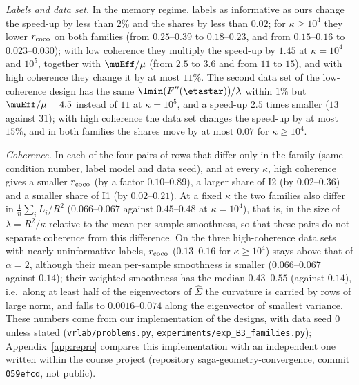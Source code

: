 \emph{Labels and data set.} In the memory regime, labels as informative as ours change the speed-up by less than $2\%$ and
the shares by less than $0.02$; for $\kappa\ge10^4$ they lower $r_{\rm coco}$ on both families (from $0.25$--$0.39$ to $0.18$--$0.23$,
and from $0.15$--$0.16$ to $0.023$--$0.030$); with low coherence they multiply the speed-up by $1.45$ at $\kappa=10^4$ and
$10^5$, together with $\muEff/\mu$ (from $2.5$ to $3.6$ and from $11$ to $15$), and with high coherence they change it by
at most $11\%$. The second data set of the low-coherence design has the same $\lmin(F''(\etastar))/\lambda$ within $1\%$
but $\muEff/\mu=4.5$ instead of $11$ at $\kappa=10^5$, and a speed-up $2.5$ times smaller ($13$ against $31$); with high
coherence the data set changes the speed-up by at most $15\%$, and in both families the shares move by at most $0.07$ for
$\kappa\ge10^4$.

\emph{Coherence.} In each of the four pairs of rows that differ only in the family (same condition number, label model
and data seed), and at every $\kappa$, high coherence gives a smaller $r_{\rm coco}$ (by a factor $0.10$--$0.89$), a larger
share of I2 (by $0.02$--$0.36$) and a smaller share of I1 (by $0.02$--$0.21$). At a fixed $\kappa$ the two families also
differ in $\frac1n\sum_iL_i/R^2$ ($0.066$--$0.067$ against $0.45$--$0.48$ at $\kappa=10^4$), that is, in the size of
$\lambda=R^2/\kappa$ relative to the mean per-sample smoothness, so that these pairs do not separate coherence from this
difference. On the three high-coherence data sets with nearly uninformative labels, $r_{\rm coco}$ ($0.13$--$0.16$ for
$\kappa\ge10^4$) stays above that of $\alpha=2$, although their mean per-sample smoothness is smaller ($0.066$--$0.067$
against $0.14$); their weighted smoothness has the median $0.43$--$0.55$ (against $0.14$), i.e.\ along at least half of
the eigenvectors of $\hat\Sigma$ the curvature is carried by rows of large norm, and falls to $0.0016$--$0.074$ along the
eigenvector of smallest variance. These numbers come from our implementation of the designs, with data seed $0$ unless
stated (\nolinkurl{vrlab/problems.py}, \nolinkurl{experiments/exp_B3_families.py}); Appendix~\ref{app:repro} compares
this implementation with an independent one written within the course project (repository saga-geometry-convergence,
commit \texttt{059efcd}, not public).

